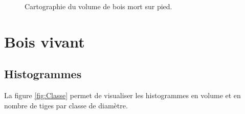 \documentclass[a4paper]{book}\usepackage[]{graphicx}\usepackage[]{color}
\newenvironment{knitrout}{}{} %
\begin{document}
\begin{knitrout}
\color{fgcolor}\begin{figure}[H]
\caption[Cartographie du volume de bois mort sur pied]{Cartographie du volume de bois mort sur pied.\label{fig:CarteVolBMP}}
\end{figure}


\end{knitrout}



\chapter{Bois vivant}

\section {Histogrammes}
La figure \ref{fig:Classe} permet de visualiser les histogrammes en volume et en nombre de tiges par classe de diamètre.
\end{document}
